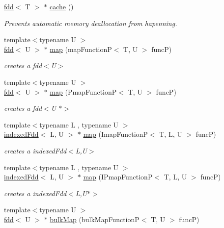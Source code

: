 \begin{DoxyCompactItemize}
\hyperlink{classfaster_1_1fdd}{fdd}$<$ T $>$ $\ast$ \hyperlink{group__memmodel_gac460ea12f02045a3d9203bb83eb5adb3}{cache} ()
\begin{DoxyCompactList}\small\item\em Prevents automatic memory deallocation from hapenning. \end{DoxyCompactList}\item 
{\footnotesize template$<$typename U $>$ }\\\hyperlink{classfaster_1_1fdd}{fdd}$<$ U $>$ $\ast$ \hyperlink{group__map_ga214d07df3240baf348492f9a4186d5cc}{map} (map\+FunctionP$<$ T, U $>$ funcP)
\begin{DoxyCompactList}\small\item\em creates a fdd$<$\+U$>$ \end{DoxyCompactList}\item 
{\footnotesize template$<$typename U $>$ }\\\hyperlink{classfaster_1_1fdd}{fdd}$<$ U $>$ $\ast$ \hyperlink{group__map_ga2cfde53328f21d2ffba58dde111219ff}{map} (Pmap\+FunctionP$<$ T, U $>$ funcP)
\begin{DoxyCompactList}\small\item\em creates a fdd$<$\+U $\ast$$>$ \end{DoxyCompactList}\item 
{\footnotesize template$<$typename L , typename U $>$ }\\\hyperlink{classfaster_1_1indexedFdd}{indexed\+Fdd}$<$ L, U $>$ $\ast$ \hyperlink{group__map_ga17066a9f6526c2c630d730727c6b1b51}{map} (Imap\+FunctionP$<$ T, L, U $>$ funcP)
\begin{DoxyCompactList}\small\item\em creates a indexed\+Fdd$<$\+L,\+U$>$ \end{DoxyCompactList}\item 
{\footnotesize template$<$typename L , typename U $>$ }\\\hyperlink{classfaster_1_1indexedFdd}{indexed\+Fdd}$<$ L, U $>$ $\ast$ \hyperlink{group__map_ga61ce985503e31026794696c6c6db20b8}{map} (I\+Pmap\+FunctionP$<$ T, L, U $>$ funcP)
\begin{DoxyCompactList}\small\item\em creates a indexed\+Fdd$<$\+L,\+U$\ast$$>$ \end{DoxyCompactList}\item 
{\footnotesize template$<$typename U $>$ }\\\hyperlink{classfaster_1_1fdd}{fdd}$<$ U $>$ $\ast$ \hyperlink{group__bulk_ga0b4b82535fe1d2746973ce4e203d619f}{bulk\+Map} (bulk\+Map\+FunctionP$<$ T, U $>$ funcP)

\end{DoxyCompactItemize}
